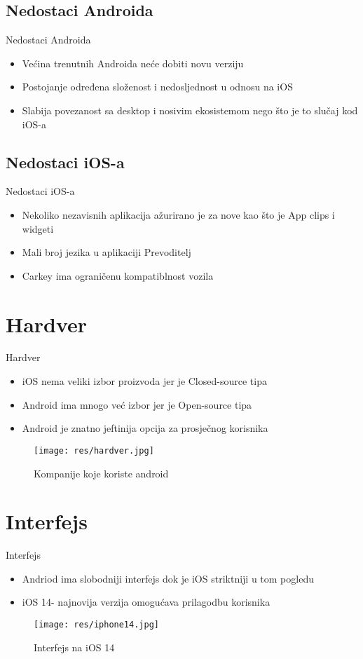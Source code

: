 \documentclass{beamer}
\begin{document}
\subsection{Nedostaci Androida}
\begin{frame}{Nedostaci Androida}
\begin{itemize}
\item Većina trenutnih Androida neće dobiti novu verziju
\item Postojanje određena složenost i nedosljednost u odnosu na iOS
\item Slabija povezanost sa desktop i nosivim ekosistemom nego što je to slučaj kod iOS-a
\end{itemize}
\end{frame}
\subsection{Nedostaci iOS-a}
\begin{frame}{Nedostaci iOS-a}
\begin{itemize}
\item Nekoliko nezavisnih aplikacija ažurirano je za nove kao što je App clips i widgeti
\item Mali broj jezika u aplikaciji Prevoditelj
\item Carkey ima ograničenu kompatiblnost vozila
\end{itemize}
\end{frame}
\section{Hardver}
\begin{frame}{Hardver}
\begin{itemize}
\item iOS nema veliki izbor proizvoda jer je Closed-source tipa
\item Android ima mnogo već izbor jer je Open-source tipa
\item Android je znatno jeftinija opcija za prosječnog korisnika 
\end{itemize}
\begin{figure}[h]
\centering
\captionsetup{}
\texttt{[image: res/hardver.jpg]}
\caption{Kompanije koje koriste android}
\end{figure}
\end{frame}
\section{Interfejs}
\begin{frame}{Interfejs}
\begin{itemize}
\item Andriod ima slobodniji interfejs dok je iOS striktniji u tom pogledu
\item iOS 14- najnovija verzija omogućava prilagodbu korisnika
\end{itemize}
\begin{figure}[h]
\centering
\captionsetup{}
\texttt{[image: res/iphone14.jpg]}
\caption{Interfejs na iOS 14}
\end{figure}
\end{frame}
\end{document}
